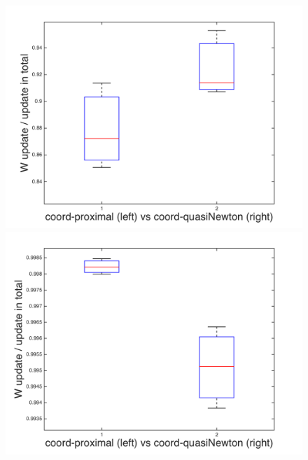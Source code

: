 \documentclass{article}
\begin{document}
\begin{figure}[htbp]
  \centering
  \begin{minipage}{0.24\textwidth}
    \centering
    \includegraphics[width=1\textwidth]{../yanyu_code/plots/sym_w0wW_box_p30}
  \end{minipage}
  \hfill
  \begin{minipage}{0.24\textwidth}
    \centering
    \includegraphics[width=1\textwidth]{../yanyu_code/plots/asym_w0wW_box_p30}
  \end{minipage}
  \hfill
  \begin{minipage}{0.24\textwidth}
    \centering

\end{minipage}
\end{figure}
\end{document}
